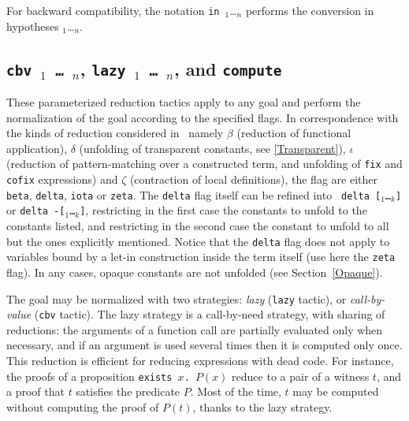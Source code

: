 \begin{coq_example*}
For backward compatibility, the notation \texttt{in}~{\ident}$_1$\ldots {\ident}$_n$
performs the conversion in hypotheses {\ident}$_1$\ldots {\ident}$_n$.


\subsection{{\tt cbv \flag$_1$ \mbox{\dots} \flag$_n$}, {\tt lazy \flag$_1$
\mbox{\dots} \flag$_n$}, and \tt compute}
\label{vmcompute}
\label{nativecompute}

These parameterized reduction tactics apply to any goal and perform
the normalization of the goal according to the specified flags. In
correspondence with the kinds of reduction considered in \Coq\, namely
$\beta$ (reduction of functional application), $\delta$ (unfolding of
transparent constants, see \ref{Transparent}), $\iota$ (reduction of
pattern-matching over a constructed term, and unfolding of {\tt fix}
and {\tt cofix} expressions) and $\zeta$ (contraction of local
definitions), the flag are either {\tt beta}, {\tt delta}, {\tt iota}
or {\tt zeta}. The {\tt delta} flag itself can be refined into {\tt
delta [\qualid$_1$\ldots\qualid$_k$]} or {\tt delta
-[\qualid$_1$\ldots\qualid$_k$]}, restricting in the first case the
constants to unfold to the constants listed, and restricting in the
second case the constant to unfold to all but the ones explicitly
mentioned. Notice that the {\tt delta} flag does not apply to
variables bound by a let-in construction inside the term itself (use
here the {\tt zeta} flag). In any cases, opaque constants are not
unfolded (see Section~\ref{Opaque}).

The goal may be normalized with two strategies: {\em lazy} ({\tt lazy}
tactic), or {\em call-by-value} ({\tt cbv} tactic). The lazy strategy
is a call-by-need strategy, with sharing of reductions: the arguments of a
function call are partially evaluated only when necessary, and if an
argument is used several times then it is computed only once. This
reduction is efficient for reducing expressions with dead code. For
instance, the proofs of a proposition {\tt exists~$x$. $P(x)$} reduce to a
pair of a witness $t$, and a proof that $t$ satisfies the predicate
$P$. Most of the time, $t$ may be computed without computing the proof
of $P(t)$, thanks to the lazy strategy.


\end{coq_example*}

